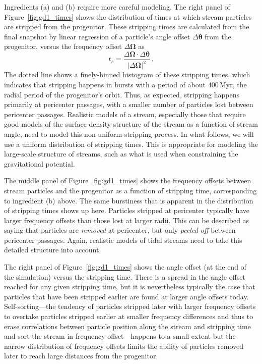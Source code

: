 \documentclass{emulateapj}
\renewcommand{\figurename}{Figure}
\renewcommand{\vec}[1]{\ensuremath{\mathbf{#1}}}
\newcommand{\veco}{\ensuremath{\vec{\Omega}}}
\newcommand{\veca}{\ensuremath{\boldsymbol\theta}}
\newcommand{\Myr}{\ensuremath{\,\mathrm{Myr}}}
\newcommand{\ts}{\ensuremath{t_s}}
\begin{document}
Ingredients (a) and (b) require more careful modeling. The right panel
of \figurename~\ref{fig:gd1_times} shows the distribution of times at
which stream particles are stripped from the progenitor. These
stripping times are calculated from the final snapshot by linear
regression of a particle's angle offset $\Delta \veca$ from the
progenitor, versus the frequency offset $\Delta \veco$ as 
\begin{equation}
  \ts = \frac{\Delta \veco \cdot \Delta \veca}{|\Delta \veco|^2}\,.
\end{equation}
The dotted line shows a finely-binned histogram of these stripping
times, which indicates that stripping happens in bursts with a period
of about $400\Myr$, the radial period of the progenitor's orbit. Thus,
as expected, stripping happens primarily at pericenter passages, with
a smaller number of particles lost between pericenter
passages. Realistic models of a stream, especially those that require
good models of the surface-density structure of the stream as a
function of stream angle, need to model this non-uniform stripping
process. In what follows, we will use a uniform distribution of
stripping times. This is appropriate for modeling the large-scale
structure of streams, such as what is used when constraining the
gravitational potential.

The middle panel of \figurename~\ref{fig:gd1_times} shows the
frequency offsets between stream particles and the progenitor as a
function of stripping time, corresponding to ingredient (b) above. The
same burstiness that is apparent in the distribution of stripping
times shows up here. Particles stripped at pericenter typically have
larger frequency offsets than those lost at larger radii. This can be
described as saying that particles are \emph{removed} at pericenter,
but only \emph{peeled off} between pericenter passages. Again,
realistic models of tidal streams need to take this detailed structure
into account.

The right panel of \figurename~\ref{fig:gd1_times} shows the angle
offset (at the end of the simulation) versus the stripping time. There
is a spread in the angle offset reached for any given stripping time,
but it is nevertheless typically the case that particles that have
been stripped earlier are found at larger angle offsets
today. Self-sorting---the tendency of particles stripped later with
larger frequency offsets to overtake particles stripped earlier at
smaller frequency differences and thus to erase correlations between
particle position along the stream and stripping time and sort the
stream in frequency offset---happens to a small extent but the narrow
distribution of frequency offsets limits the ability of particles
removed later to reach large distances from the progenitor.
\end{document}
